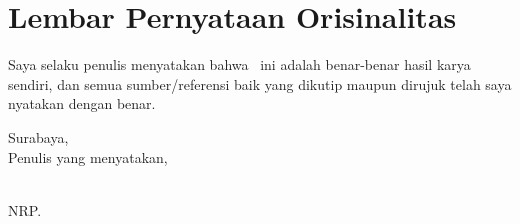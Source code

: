 %
%
%


\chapter*{Lembar Pernyataan Orisinalitas}


\vspace*{2.5cm}


{
  \centering
  Saya selaku penulis menyatakan bahwa \type\ ini adalah benar-benar hasil karya sendiri, dan semua sumber/referensi baik yang dikutip maupun dirujuk telah saya nyatakan dengan benar. \\
}

\vspace*{4.0cm}

{
  \centering
  Surabaya, \tanggalSiapSidang \\
  Penulis yang menyatakan, \\
}

\vspace*{1.5cm}

{
  \centering
  \penulis \\
  NRP. \nrp \\
}

\newpage
